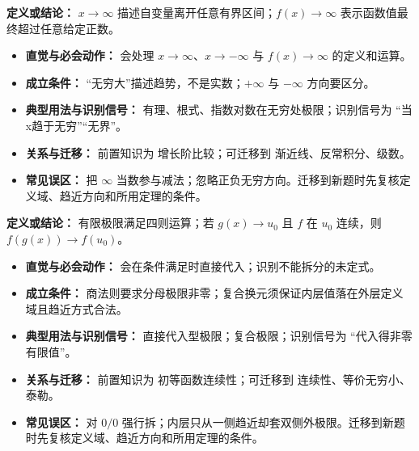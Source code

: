 \begin{knowledgeBox}
\textbf{定义或结论：} $x\to\infty$ 描述自变量离开任意有界区间；$f(x)\to\infty$ 表示函数值最终超过任意给定正数。

\begin{itemize}
  \item \textbf{直觉与必会动作：} 会处理 $x\to\infty$、$x\to-\infty$ 与 $f(x)\to\infty$ 的定义和运算。
  \item \textbf{成立条件：} “无穷大”描述趋势，不是实数；$+\infty$ 与 $-\infty$ 方向要区分。
  \item \textbf{典型用法与识别信号：} 有理、根式、指数对数在无穷处极限；识别信号为 “当x趋于无穷”“无界”。
  \item \textbf{关系与迁移：} 前置知识为 增长阶比较；可迁移到 渐近线、反常积分、级数。
  \item \textbf{常见误区：} 把 $\infty$ 当数参与减法；忽略正负无穷方向。迁移到新题时先复核定义域、趋近方向和所用定理的条件。
\end{itemize}
\end{knowledgeBox}

\begin{knowledgeBox}
\textbf{定义或结论：} 有限极限满足四则运算；若 $g(x)\to u_0$ 且 $f$ 在 $u_0$ 连续，则 $f(g(x))\to f(u_0)$。

\begin{itemize}
  \item \textbf{直觉与必会动作：} 会在条件满足时直接代入；识别不能拆分的未定式。
  \item \textbf{成立条件：} 商法则要求分母极限非零；复合换元须保证内层值落在外层定义域且趋近方式合法。
  \item \textbf{典型用法与识别信号：} 直接代入型极限；复合极限；识别信号为 “代入得非零有限值”。
  \item \textbf{关系与迁移：} 前置知识为 初等函数连续性；可迁移到 连续性、等价无穷小、泰勒。
  \item \textbf{常见误区：} 对 $0/0$ 强行拆；内层只从一侧趋近却套双侧外极限。迁移到新题时先复核定义域、趋近方向和所用定理的条件。
\end{itemize}
\end{knowledgeBox}

